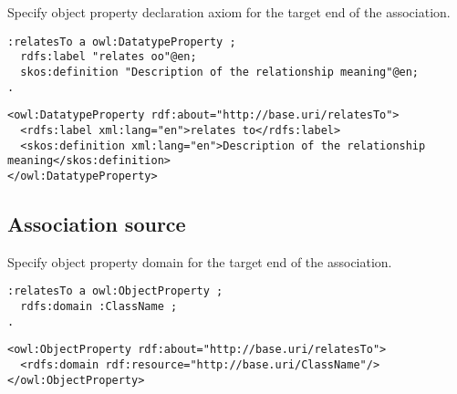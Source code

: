 \begin{trule}
	\label{rule:association-uni-core}
	Specify object property declaration axiom for the target end of the association. 
\end{trule}

\vspace{-\parskip}
\begin{minipage}[b]{.385\textwidth}
\begin{lstlisting}[language=Turtle, caption={Property declaration in Turtle syntax}, captionpos=b]
:relatesTo a owl:DatatypeProperty ;
  rdfs:label "relates oo"@en;
  skos:definition "Description of the relationship meaning"@en;
.
\end{lstlisting}
\end{minipage}%
\quad\vspace{-\parskip}
\begin{minipage}[b]{.6\textwidth}
\begin{lstlisting}[language=RDF/XML, caption={Property declaration in  RDF/XML syntax}, captionpos=b]
<owl:DatatypeProperty rdf:about="http://base.uri/relatesTo">
  <rdfs:label xml:lang="en">relates to</rdfs:label>
  <skos:definition xml:lang="en">Description of the relationship meaning</skos:definition> 
</owl:DatatypeProperty>  
\end{lstlisting}
\end{minipage}
\vspace{-\parskip}

\subsection{Association source}

\begin{trule}
	\label{rule:association-uni-domain-rc}
	Specify object property domain for the target end of the association. 
\end{trule}

\vspace{-\parskip}
\begin{minipage}[b]{.385\textwidth}
\begin{lstlisting}[language=Turtle, caption={Domain specification in Turtle syntax}, captionpos=b]
:relatesTo a owl:ObjectProperty ;
  rdfs:domain :ClassName ;
.
\end{lstlisting}
\end{minipage}%
\quad\vspace{-\parskip}
\begin{minipage}[b]{.6\textwidth}
\begin{lstlisting}[language=RDF/XML, caption={Domain specification in  RDF/XML syntax}, captionpos=b]
<owl:ObjectProperty rdf:about="http://base.uri/relatesTo">
  <rdfs:domain rdf:resource="http://base.uri/ClassName"/>
</owl:ObjectProperty>
\end{lstlisting}
\end{minipage}
\vspace{-\parskip}

